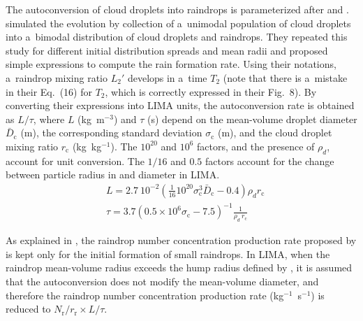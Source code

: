 {The autoconversion of cloud droplets into raindrops is parameterized after \citet{Berry1974} and \citet{Cohard2000c2r2} \citep[see also][]{Gilmore2008}. \citet{Berry1974} simulated the evolution by collection of a~unimodal population of cloud droplets into a~bimodal distribution of cloud droplets and raindrops. They repeated this study for different initial distribution spreads and mean radii and proposed simple expressions to compute the rain formation rate. Using their notations, a~raindrop mixing ratio $L_2'$ develops in a~time $T_2$ (note that there is a~mistake in their Eq.~(16) for $T_2$, which is correctly expressed in their Fig.~8). By converting their expressions into LIMA units, the autoconversion rate is obtained as $L/\tau$, where $L$ (kg~m$^{-3}$) and $\tau$ (s) depend on the mean-volume droplet diameter $\bar{D}_{\mathrm{c}}$ (m), the corresponding standard deviation $\sigma_{\mathrm{c}}$ (m), and the cloud droplet mixing ratio $r_{\mathrm{c}}$ (kg~kg$^{-1}$). The $10^{20}$ and $10^{6}$ factors, and the presence of $\rho_d$, account for unit conversion. The $1/16$ and $0.5$ factors account for the change between particle radius in \citet{Berry1974} and diameter in LIMA.
\begin{align}
& L = 2.7~10^{-2} \left( \frac{1}{16} 10^{20} \sigma_{\mathrm{c}}^3 \bar{D}_{\mathrm{c}} - 0.4 \right) \rho_d r_{\mathrm{c}} \\
& \tau = 3.7 \left( 0.5 \times 10^6 \sigma_{\mathrm{c}} - 7.5 \right)^{-1} \frac{1}{\rho_d~r_{\mathrm{c}}}
\end{align}

As explained in \citet{Cohard2000c2r2}, the raindrop number concentration production rate proposed by \citet{Berry1974} is kept only for the initial formation of small raindrops. In LIMA, when the raindrop mean-volume radius exceeds the hump radius defined by \citet{Berry1974}, it is assumed that the autoconversion does not modify the mean-volume diameter, and therefore the raindrop number concentration production rate (kg$^{-1}$~s$^{-1}$) is reduced to ${N_{\mathrm{r}}}/{r_{\mathrm{r}}}\times {L}/{\tau}$.

}
